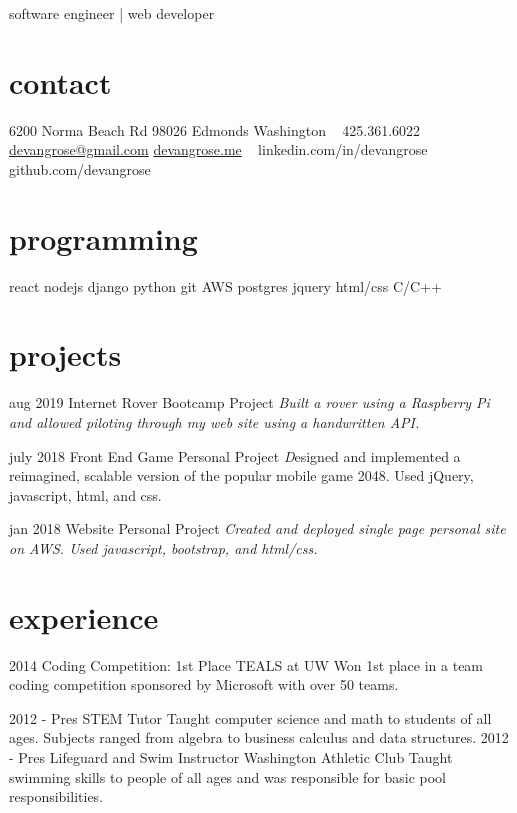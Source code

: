 \documentclass[]{friggeri-cv}
\begin{document}
       { software engineer | web developer }




\begin{aside}
  \section{contact}
    6200 Norma Beach Rd
    98026 Edmonds
    Washington
    ~
    425.361.6022
    \href{mailto:devangrose@gmail.com}{devangrose@gmail.com}
    \href{http://devangrose.me}{devangrose.me}
    ~
    linkedin.com/in/devangrose
    github.com/devangrose
  \section{programming}
    react
    nodejs
    django
    python
    git
    AWS
    postgres
    jquery
    html/css
    C/C++

\end{aside}


\section{projects}

\begin{entrylist}

  \entry
    {aug 2019}
    {Internet Rover}
    {Bootcamp Project}
    {\emph{Built a rover using a Raspberry Pi and allowed piloting through my web site using a handwritten API.}}

  \entry
    {july 2018}
    {Front End Game}
    {Personal Project}
    {\emph Designed and implemented a reimagined, scalable version of the popular mobile game 2048. Used jQuery, javascript, html, and css.}

  \entry
    {jan 2018}
    {Website}
    {Personal Project}
    {\emph{Created and deployed single page personal site on AWS. Used javascript, bootstrap, and html/css.}}

\end{entrylist}

\section{experience}

\begin{entrylist}
  \entry
    {2014}
    {Coding Competition: 1st Place}
    {TEALS at UW}
    {Won 1st place in a team coding competition sponsored by Microsoft with over 50 teams.}


  \entry
    {2012 - Pres}
    {STEM Tutor}
    {}
    {Taught computer science and math to students of all ages. Subjects ranged from algebra to business calculus and data structures.}
  \entry
    {2012 - Pres}
    {Lifeguard and Swim Instructor}
    {Washington Athletic Club}
    {Taught swimming skills to people of all ages and was responsible for basic pool responsibilities.}
\end{entrylist}
\end{document}
